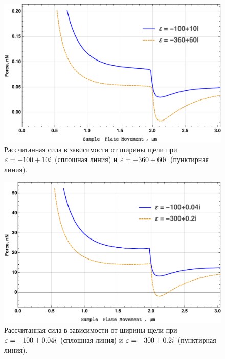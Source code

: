 \begin{figure}
    \centering
    \includegraphics[width=\textwidth]{figures/ForceGauss_Newton_10010_36060.pdf}
    \caption{Рассчитанная сила в зависимости от ширины щели при $\varepsilon = -100 + 10i$ (сплошная линия) и $\varepsilon = -360+60i$ (пунктирная линия).}
    \label{fig:force_N_2eps_1}
\end{figure}
\begin{figure}
    \centering
    \includegraphics[width=\textwidth]{figures/ForceGauss_Newton_100_004_300_02.pdf}
    \caption{Рассчитанная сила в зависимости от ширины щели при  $\varepsilon=-100+0.04i$ (сплошная линия) и $\varepsilon = -300 + 0.2i$ (пунктирная линия).}
    \label{fig:force_N_2eps_2}
\end{figure}



